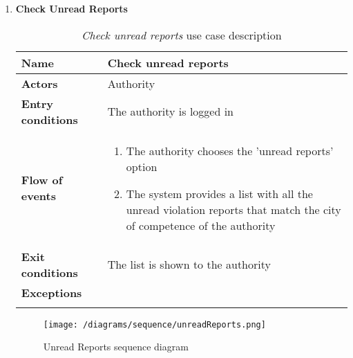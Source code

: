 \begin{enumerate}
			\item \textbf{Check Unread Reports}
				\begin{longtable}{p{0.26\linewidth}p{0.75\linewidth}}
					\toprule
					\textbf{Name} & \textbf{Check unread reports} \\
					\midrule
					\textbf{Actors} & Authority\\
					\midrule
					\textbf{Entry conditions} & The authority is logged in \\
					\midrule
					\textbf{Flow of events} & 
					\begin{enumerate}
						\item The authority chooses the 'unread reports' option
						\item The system provides a list with all the unread violation reports that match the city of competence of the authority
					\end{enumerate} \\
					\midrule
					\textbf{Exit conditions} & The list is shown to the authority\\
					\midrule
					\textbf{Exceptions} &  \\
					\bottomrule
					\caption{\emph{Check unread reports} use case description}
				\end{longtable}
				
				\begin{figure}[h]
					\centering
					\texttt{[image: /diagrams/sequence/unreadReports.png]}
					\caption{Unread Reports sequence diagram}
				\end{figure}
				

\end{enumerate}
